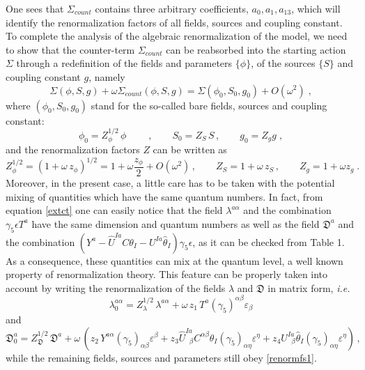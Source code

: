 \begin{appendix}
\noindent One sees that $\Sigma_{count}$ contains three arbitrary coefficients, $a_0, a_1,
a_{13}$, which will identify the renormalization factors of all fields, sources and coupling
constant. To complete the analysis of the algebraic renormalization of the model, we need to
show that the counter-term $\Sigma_{count}$ can be reabsorbed into the starting action $\Sigma$ through a redefinition of the fields and parameters $\{\phi \}$, of the sources $\{ S \}$ and coupling constant $g$, namely 
\begin{equation}
\label{ration1}
\Sigma(\phi,S,g) + \omega \Sigma_{count}(\phi,S,g)  = \Sigma(\phi_0,S_0,g_0) + O(\omega^2) \;, 
\end{equation}
where $(\phi_0, S_0, g_0)$ stand for the so-called bare fields, sources and coupling constant:
\begin{equation}
\label{renormfs1}
\phi_{0}=Z^{1/2}_{\phi}\,\phi  \qquad\;,   \qquad
S_{0}=Z_{S}\,S\,,  \qquad g_0 = Z_g g   \;, 
\end{equation}
and the renormalization factors  $Z$ can be written as
\begin{equation}
Z^{1/2}_{\phi}=(1+\omega\,z_\phi)^{1/2}=1+\omega \frac{z_{\phi}}{2}+O(\omega^{2})\,,\qquad
Z_{S}=1+\omega\,z_S\,, \qquad Z_g = 1 +\omega z_g \;.  
\end{equation}
Moreover, in the present case, a little care has to be taken with the potential mixing of quantities which have the same quantum numbers. In fact, from equation \eqref{extct} one can easily notice  that the field $\lambda^{a\alpha}$ and the combination $\gamma_{5}\epsilon T^{a}$ have the same dimension and quantum numbers as well as the field $\mathfrak{D}^{a}$ and the combination $\left(Y^{a}-\hat{U}^{Ia}C\theta_{I}-U^{Ia}\hat{\theta}_{I}\right)\gamma_{5}\epsilon$, as it can be checked from Table 1.   As a consequence, these quantities can mix at the quantum level, a well known property of renormalization theory. This feature can be properly taken into account by writing the renormalization of the fields $\lambda$ and $\mathfrak{D}$ in matrix form, {\it i.e.}  
\begin{equation}
\label{lrenorm1}
\lambda^{a\alpha}_{0}=Z^{1/2}_{\lambda}\,\lambda^{a\alpha}+\omega\, z_{1}\,T^{a}(\gamma_{5})^{\alpha\beta}\varepsilon_{\beta}
\end{equation}
and
\begin{equation}
\label{drenorm1}
\mathfrak{D}^{a}_{0}=Z^{1/2}_{\mathfrak{D}}\,\mathfrak{D}^{a}+\omega\,\left( z_{2}\,Y^{a\alpha}(\gamma_{5})_{\alpha\beta}\varepsilon^{\beta} + z_{3}\hat{U}^{Ia}_{\;\;\beta}C^{\alpha\beta}\theta_{I}(\gamma_{5})_{\alpha\eta}\varepsilon^{\eta} + z_{4}U^{Ia}_{\;\;\beta}\hat{\theta}_{I}(\gamma_{5})_{\alpha\eta}\varepsilon^{\eta}  \right)\,,
\end{equation}
while the remaining fields, sources and parameters still obey \eqref{renormfs1}.


\end{appendix}

